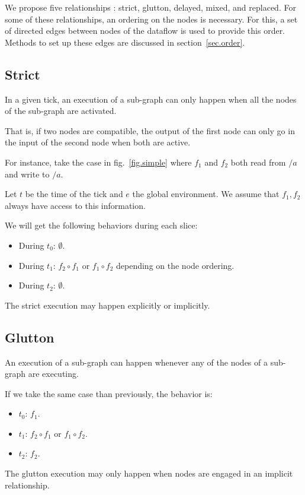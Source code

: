 \documentclass{article}
\begin{document}
We propose five relationships : strict, glutton, delayed, mixed, and replaced. 
For some of these relationships, an ordering on the nodes is necessary. 
For this, a set of directed edges between nodes of the dataflow is used to provide this order.
Methods to set up these edges are discussed in section~\ref{sec.order}.
    
\subsection{Strict}
In a given tick, an execution of a sub-graph can only happen when all the nodes of the sub-graph are activated.
    
That is, if two nodes are compatible, the output of the first node can only go in the input of the second node when both are active.
    
For instance, take the case in fig.~\ref{fig.simple} where $f_1$ and $f_2$ both read from $/a$ and write to $/a$.
    
Let $t$ be the time of the tick and $e$ the global environment. 
We assume that $f_1, f_2$ always have access to this information.
    
We will get the following behaviors during each slice: 
\begin{itemize}
  \item During $t_0$: $\emptyset$.
  \item During $t_1$: $f_2 \circ f_1 $ or $f_1 \circ f_2$ depending on the node ordering.
  \item During $t_2$: $\emptyset$. 
\end{itemize}

The strict execution may happen explicitly or implicitly.
    
\subsection{Glutton}
An execution of a sub-graph can happen whenever any of the nodes of a sub-graph are executing. 
    
If we take the same case than previously, the behavior is:
\begin{itemize}
  \item $t_0$: $f_1$.
  \item $t_1$: $f_2 \circ f_1$ or $f_1 \circ f_2$.
  \item $t_2$: $f_2$. 
\end{itemize}

The glutton execution may only happen when nodes are engaged in an implicit relationship.
    
\end{document}
